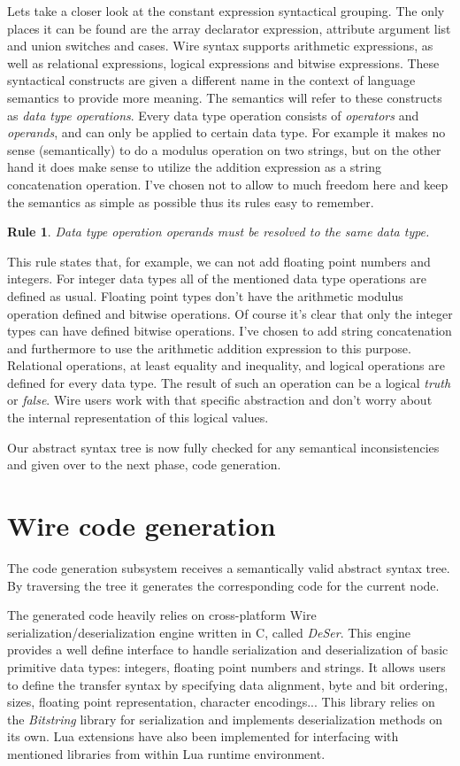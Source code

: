 \documentclass[times, utf8, diplomski]{fer}
\newtheorem{wirerule}{Rule}
\begin{document}
Lets take a closer look at the constant expression syntactical grouping. 
The only places it can be found are the array declarator expression, attribute 
argument list and union switches and cases.
Wire syntax supports arithmetic expressions, as well as relational expressions, 
logical expressions and bitwise expressions. These syntactical constructs are given 
a different name in the context of language semantics to provide more meaning. 
The semantics will refer to these constructs as \emph{data type operations}. 
Every data type operation consists of \emph{operators} and \emph{operands}, 
and can only be applied to certain data type. For example it makes no sense 
(semantically) to do a modulus operation on two strings, but on the other hand 
it does make sense to utilize the addition expression as a string concatenation 
operation.
I've chosen not to allow to much freedom here and keep the semantics as simple 
as possible thus its rules easy to remember.
\begin{wirerule}
Data type operation operands must be resolved to the same data type.
\end{wirerule}
This rule states that, for example, we can not add floating point numbers and integers.
For integer data types all of the mentioned data type operations are defined as usual. 
Floating point types don't have the arithmetic modulus operation defined and 
bitwise operations. Of course it's clear that only the integer types can have 
defined bitwise operations. I've chosen to add string concatenation and furthermore 
to use the arithmetic addition expression to this purpose.
Relational operations, at least equality and inequality, and logical operations
are defined for every data type. The result of such an operation can be a 
logical \emph{truth} or \emph{false}. Wire users work with that specific abstraction 
and don't worry about the internal representation of this logical values.

Our abstract syntax tree is now fully checked for any semantical inconsistencies 
and given over to the next phase, code generation.

\section{Wire code generation}
The code generation subsystem receives a semantically valid abstract syntax tree.
By traversing the tree it generates the corresponding code for the current node.

The generated code heavily relies on cross-platform Wire serialization/deserialization 
engine written in C, called \emph{DeSer}. This engine provides a well define interface to handle serialization
and deserialization of basic primitive data types: integers, floating point numbers and strings.
It allows users to define the transfer syntax by specifying data alignment, byte and bit ordering, 
sizes, floating point representation, character encodings... This library relies
on the \emph{Bitstring} library for serialization and implements deserialization
methods on its own. Lua extensions have also been implemented for interfacing with
mentioned libraries from within Lua runtime environment.
\end{document}
